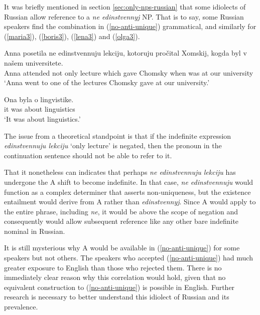 It was briefly mentioned in section \ref{sec:only-nps-russian} that some idiolects of Russian allow reference to a \textit{ne edinstvennyj} NP. That is to say, some Russian speakers find the combination in (\ref{no-anti-unique}) grammatical, and similarly for (\ref{maria3}), (\ref{boris3}), (\ref{lena3}) and (\ref{olga3}).

\begin{exe}
	\ex \label{no-anti-unique} \begin{xlist}
		\ex \gll Anna posetila ne edinstvennuju lekciju, kotoruju pro\v{c}ital Xomskij, kogda byl v na\v{s}em universitete.\\
		Anna attended not only lecture which gave Chomsky when was at our university\\
		\glt `Anna went to one of the lectures Chomsky gave at our university.'
		
		\ex \gll Ona byla o lingvistike.\\
		it was about linguistics\\
		\glt `It was about linguistics.'
	\end{xlist}
\end{exe}

The issue from a theoretical standpoint is that if the indefinite expression \textit{edinstvennuju lekciju} `only lecture' is negated, then the pronoun in the continuation sentence should not be able to refer to it.

That it nonetheless can indicates that perhaps \textit{ne edinstvennuju lekciju} has undergone the \textsc{A} shift to become indefinite. In that case, \textit{ne edinstvennuju} would function as a complex determiner that asserts non-uniqueness, but the existence entailment would derive from \textsc{A} rather than \textit{edinstvennyj}. Since \textsc{A} would apply to the entire phrase, including \textit{ne}, it would be above the scope of negation and consequently would allow subsequent reference like any other bare indefinite nominal in Russian.

It is still mysterious why \textsc{A} would be available in (\ref{no-anti-unique}) for some speakers but not others. The speakers who accepted (\ref{no-anti-unique}) had much greater exposure to English than those who rejected them. There is no immediately clear reason why this correlation would hold, given that no equivalent construction to (\ref{no-anti-unique}) is possible in English. Further research is necessary to better understand this idiolect of Russian and its prevalence.


